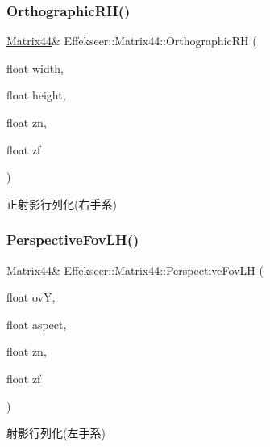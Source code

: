 \subsubsection{\texorpdfstring{Orthographic\+R\+H()}{OrthographicRH()}}
{\footnotesize\ttfamily \mbox{\hyperlink{struct_effekseer_1_1_matrix44}{Matrix44}}\& Effekseer\+::\+Matrix44\+::\+Orthographic\+RH (\begin{DoxyParamCaption}\item[{float}]{width,  }\item[{float}]{height,  }\item[{float}]{zn,  }\item[{float}]{zf }\end{DoxyParamCaption})}



正射影行列化(右手系) 

\mbox{\label{struct_effekseer_1_1_matrix44_a01facdf54829125dfefa4b1f29210c74}} 
\subsubsection{\texorpdfstring{Perspective\+Fov\+L\+H()}{PerspectiveFovLH()}}
{\footnotesize\ttfamily \mbox{\hyperlink{struct_effekseer_1_1_matrix44}{Matrix44}}\& Effekseer\+::\+Matrix44\+::\+Perspective\+Fov\+LH (\begin{DoxyParamCaption}\item[{float}]{ovY,  }\item[{float}]{aspect,  }\item[{float}]{zn,  }\item[{float}]{zf }\end{DoxyParamCaption})}



射影行列化(左手系) 

\mbox{\label{struct_effekseer_1_1_matrix44_a6772f3ebb3a465742d6abde9a1e823ac}} 
